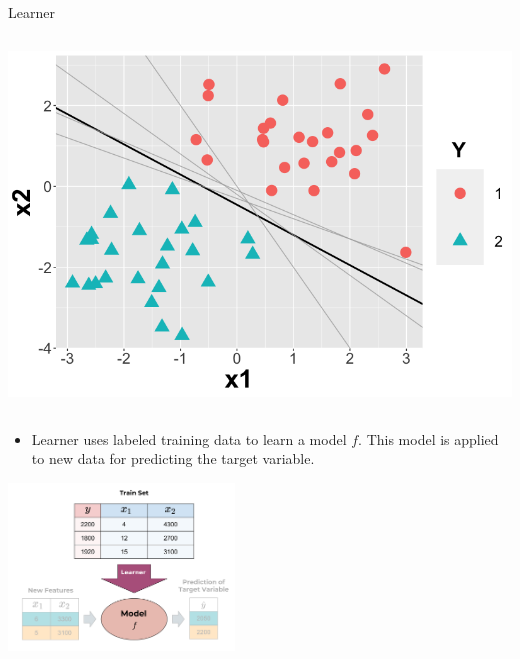 \documentclass[11pt,compress,t,notes=noshow, xcolor=table]{beamer}
\begin{document}
\begin{vbframe}{Learner}
\begin{columns}
\begin{column}{0.4\textwidth}
  \begin{center}
    \includegraphics[width=\textwidth]{slides/ml-basics/figure/nutshell-ml-basics-hypothesisspace-classif.png} 
  \end{center}
\end{column}    
\end{columns}  

\newpage

\begin{itemize}
\item Learner uses labeled training data to learn a model $f$. This model is applied to new data for predicting the target variable.
\end{itemize}

 \begin{center}
    \includegraphics[width = 0.45\textwidth]{figure_man/the_inducer_web.png}
  \end{center}

\end{vbframe}
\end{document}
